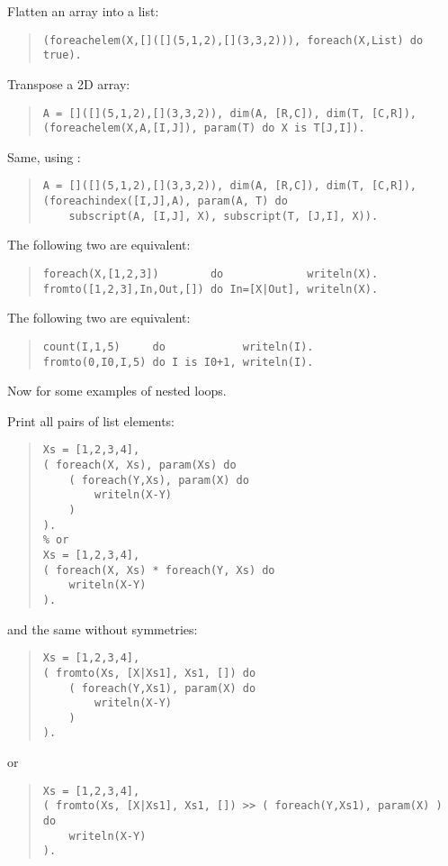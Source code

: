Flatten an array into a list:
\begin{quote}
\begin{verbatim}
(foreachelem(X,[]([](5,1,2),[](3,3,2))), foreach(X,List) do true).
\end{verbatim}
\end{quote}

Transpose a 2D array:
\begin{quote}
\begin{verbatim}
A = []([](5,1,2),[](3,3,2)), dim(A, [R,C]), dim(T, [C,R]),
(foreachelem(X,A,[I,J]), param(T) do X is T[J,I]).
\end{verbatim}
\end{quote}

Same, using :
\begin{quote}
\begin{verbatim}
A = []([](5,1,2),[](3,3,2)), dim(A, [R,C]), dim(T, [C,R]),
(foreachindex([I,J],A), param(A, T) do
    subscript(A, [I,J], X), subscript(T, [J,I], X)).
\end{verbatim}
\end{quote}

The following two are equivalent:
\begin{quote}
\begin{verbatim}
foreach(X,[1,2,3])        do             writeln(X).
fromto([1,2,3],In,Out,[]) do In=[X|Out], writeln(X).
\end{verbatim}
\end{quote}

The following two are equivalent:
\begin{quote}
\begin{verbatim}
count(I,1,5)     do            writeln(I).
fromto(0,I0,I,5) do I is I0+1, writeln(I).
\end{verbatim}
\end{quote}

Now for some examples of nested loops.

Print all pairs of list elements:
\begin{quote}
\begin{verbatim}
Xs = [1,2,3,4],
( foreach(X, Xs), param(Xs) do
    ( foreach(Y,Xs), param(X) do
        writeln(X-Y)
    )
).
% or
Xs = [1,2,3,4],
( foreach(X, Xs) * foreach(Y, Xs) do
    writeln(X-Y)
).
\end{verbatim}
\end{quote}
and the same without symmetries:
\begin{quote}
\begin{verbatim}
Xs = [1,2,3,4],
( fromto(Xs, [X|Xs1], Xs1, []) do
    ( foreach(Y,Xs1), param(X) do
        writeln(X-Y)
    )
).
\end{verbatim}
\end{quote}
or
\begin{quote}
\begin{verbatim}
Xs = [1,2,3,4],
( fromto(Xs, [X|Xs1], Xs1, []) >> ( foreach(Y,Xs1), param(X) ) do
    writeln(X-Y)
).
\end{verbatim}
\end{quote}

